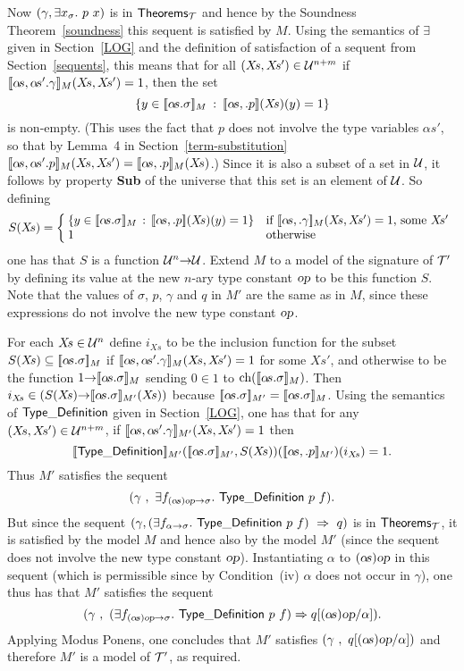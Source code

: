 Now $(\gamma,\exists x_{\sigma}.\ p\ x)$ is in ${\sf Theorems}_{\cal T}$
and hence by the Soundness Theorem~\ref{soundness} this sequent is
satisfied by $M$. Using the semantics of $\exists$ given in
Section~\ref{LOG} and the definition of satisfaction of a sequent from
Section~\ref{sequents}, this means that for all $(X\!s,X\!s')\in{\cal U}^{n+m}$
if $[\![\alpha\!s,\alpha\!s'.\gamma]\!]_M(X\!s,X\!s')=1$, then
the set
\[
\{y\in[\![\alpha\!s.\sigma]\!]_{M}\: :\: [\![\alpha\!s,.p]\!](X\!s)(y)=1\}
\]
is non-empty. (This uses the fact that $p$ does not involve
the type variables $\alpha\!s'$, so that by Lemma~4 in
Section~\ref{term-substitution}
$\den{\alpha\!s,\alpha\!s'.p}_M(X\!s,X\!s')=\den{\alpha\!s,.p}_M(X\!s)$.)
Since it is also a subset of a set in $\cal U$, it
follows by property {\bf Sub} of the universe that this set is an element of
$\cal U$. So defining
\[
S(X\!s) = \left\{\hspace{-1mm}
\begin{array}{ll}
\{y\in\den{\alpha\!s.\sigma}_{M}\, :\,\den{\alpha\!s,.p}(X\!s)(y)=1\}
  & \mbox{\rm if $\den{\alpha\!s,.\gamma}_M(X\!s,X\!s')=1$, some $X\!s'$}\\
1 & \mbox{\rm otherwise}
\end{array}
\right.%
\]
one has that $S$ is a function ${\cal U}^n{\to}{\cal U}$.  Extend $M$
to a model of the signature of ${\cal T}'$ by defining its value at
the new $n$-ary type constant $\textsl{op}$ to be this function $S$. Note
that the values of $\sigma$, $p$, $\gamma$ and
$q$ in $M'$ are the same as in $M$, since these expressions do not
involve the new type constant $\textsl{op}$.

For each $X\!s\in{\cal U}^{n}$ define $i_{X\!s}$ to be the inclusion
function for the subset $S(X\!s)\subseteq[\![\alpha\!s.\sigma]\!]_{M}$
if $[\![\alpha\!s,\alpha\!s'.\gamma]\!]_M(X\!s,X\!s')=1$ for some
$X\!s'$, and otherwise to be the function
$1{\to}[\![\alpha\!s.\sigma]\!]_{M}$ sending $0\in 1$ to
$\mbox{\rm ch}([\![\alpha\!s.\sigma]\!]_{M})$. Then
$i_{X\!s}\in(S(X\!s){\to}[\![\alpha\!s.\sigma]\!]_{M'}(X\!s))$ because
$[\![\alpha\!s.\sigma]\!]_{M'}=[\![\alpha\!s.\sigma]\!]_M$. Using the
semantics of ${\sf Type\_Definition}$ given in Section~\ref{LOG}, one has that for any
$(X\!s,X\!s')\in{\cal U}^{n+m}$, if
$[\![\alpha\!s,\alpha\!s'.\gamma]\!]_{M'}(X\!s,X\!s')=1$ then
\[
\den{\TyDef}_{M'}(\den{\alpha\!s.\sigma}_{M'} ,
   S(X\!s))(\den{\alpha\!s,.p}_{M'})(i_{X\!s}) = 1.
\]
Thus $M'$ satisfies the sequent
\[
(\gamma\ ,\ \exists f_{(\alpha\!s)\textsl{op}{\to}\sigma}.\ {\sf Type\_Definition}\ p\ f).
\]
But since the sequent $(\gamma,(\exists f_{\alpha{\to}\sigma}.\ {\sf
Type\_Definition}\ p\ f)\ \Rightarrow\ q )$ is in ${\sf Theorems}_{\cal T}$,
it is satisfied by the model $M$ and hence also by the model $M'$
(since the sequent does not involve the new type constant $\textsl{op}$).
Instantiating $\alpha$ to $(\alpha\!s)\textsl{op}$ in this sequent (which
is permissible since by Condition~(iv) $\alpha$ does not occur in
$\gamma$), one thus has that $M'$ satisfies the sequent
\[
(\gamma\ ,\
(\exists f_{(\alpha\!s)\textsl{op}{\to}\sigma}.\ {\sf Type\_Definition}\ p\ f)\Rightarrow
q[(\alpha\!s)\textsl{op}/\alpha]).
\]
Applying Modus Ponens, one concludes that $M'$ satisfies
$(\gamma\ ,\ q[(\alpha\!s)\textsl{op}/\alpha])$ and
therefore $M'$ is a model of ${\cal T}'$, as required.

